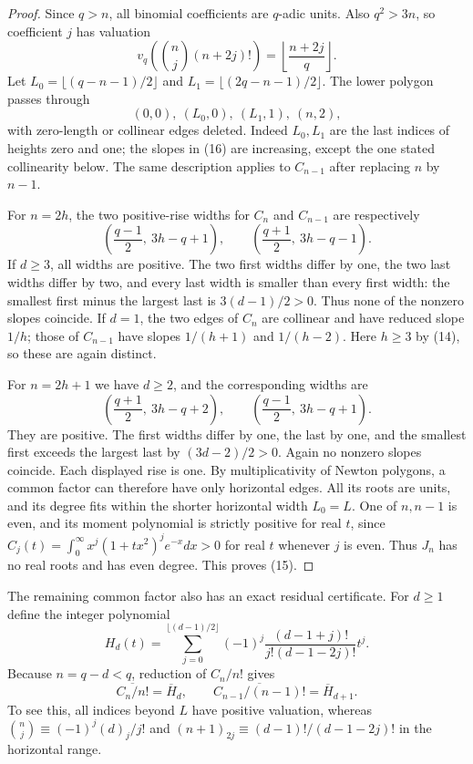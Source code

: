 \documentclass[11pt]{article}
\begin{document}
\begin{proof}
Since $q>n$, all binomial coefficients are $q$-adic units. Also
$q^2>3n$, so coefficient $j$ has valuation
\[
                  v_q\!\left(\binom nj(n+2j)!\right)
                           =\left\lfloor\frac{n+2j}{q}\right\rfloor.
\]
Let $L_0=\lfloor(q-n-1)/2\rfloor$ and
$L_1=\lfloor(2q-n-1)/2\rfloor$.
The lower polygon passes through
\[
                  (0,0),\ (L_0,0),\ (L_1,1),\ (n,2),     \tag{16}
\]
with zero-length or collinear edges deleted. Indeed $L_0,L_1$ are the
last indices of heights zero and one; the slopes in (16) are increasing,
except the one stated collinearity below. The same description applies
to $C_{n-1}$ after replacing $n$ by $n-1$.

For $n=2h$, the two positive-rise widths for $C_n$ and $C_{n-1}$ are
respectively
\[
 \left(\frac{q-1}{2},\ 3h-q+1\right),\qquad
 \left(\frac{q+1}{2},\ 3h-q-1\right).                      \tag{17}
\]
If $d\ge3$, all widths are positive. The two first widths differ by one,
the two last widths differ by two, and every last width is smaller than
every first width: the smallest first minus the largest last is
$3(d-1)/2>0$. Thus none of the nonzero slopes coincide.
If $d=1$, the two edges of $C_n$ are collinear and have reduced slope
$1/h$; those of $C_{n-1}$ have slopes $1/(h+1)$ and $1/(h-2)$.
Here $h\ge3$ by (14), so these are again distinct.

For $n=2h+1$ we have $d\ge2$, and the corresponding widths are
\[
 \left(\frac{q+1}{2},\ 3h-q+2\right),\qquad
 \left(\frac{q-1}{2},\ 3h-q+1\right).                      \tag{18}
\]
They are positive. The first widths differ by one, the last by one,
and the smallest first exceeds the largest last by $(3d-2)/2>0$.
Again no nonzero slopes coincide. Each displayed rise is one.
By multiplicativity of Newton polygons, a common factor can therefore
have only horizontal edges. All its roots are units, and its degree
fits within the shorter horizontal width $L_0=L$.
One of $n,n-1$ is even, and its moment polynomial is strictly positive
for real $t$, since $C_j(t)=\int_0^\infty x^j(1+tx^2)^j e^{-x}dx>0$
for real $t$ whenever $j$ is even.
Thus $J_n$ has no real roots and has even degree. This proves (15).
\end{proof}

The remaining common factor also has an exact residual certificate.
For $d\ge1$ define the integer polynomial
\[
 H_d(t)=\sum_{j=0}^{\lfloor(d-1)/2\rfloor}
             (-1)^j\frac{(d-1+j)!}{j!(d-1-2j)!}t^j.        \tag{19}
\]
Because $n=q-d<q$, reduction of $C_n/n!$ gives
\[
            \overline{C_n/n!}=\overline H_d,\qquad
            \overline{C_{n-1}/(n-1)!}=\overline H_{d+1}.    \tag{20}
\]
To see this, all indices beyond $L$ have positive valuation, whereas
$\binom nj\equiv(-1)^j(d)_j/j!$ and
$(n+1)_{2j}\equiv(d-1)!/(d-1-2j)!$ in the horizontal range.
\end{document}
